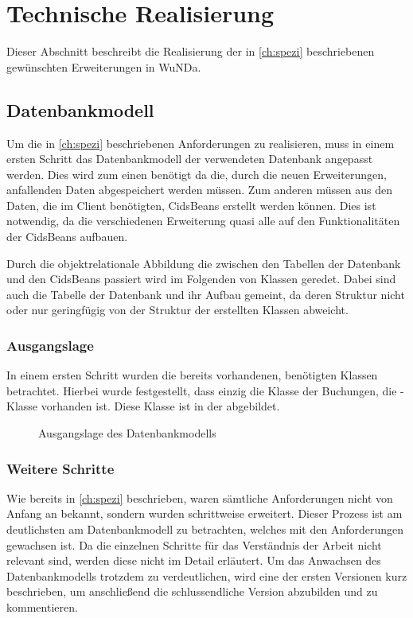 \section{Technische Realisierung}
Dieser Abschnitt beschreibt die Realisierung der in \autoref{ch:spezi} beschriebenen gewünschten Erweiterungen in \ac{WuNDa}.

\subsection{Datenbankmodell}
Um die in \autoref{ch:spezi} beschriebenen Anforderungen zu realisieren, muss in einem ersten Schritt das Datenbankmodell der verwendeten Datenbank angepasst werden.
Dies wird zum einen benötigt da die, durch die neuen Erweiterungen, anfallenden Daten abgespeichert werden müssen. Zum anderen müssen aus den Daten, die im Client benötigten, CidsBeans erstellt werden können. Dies ist notwendig, da die verschiedenen Erweiterung quasi alle auf den Funktionalitäten der CidsBeans aufbauen.

Durch die objektrelationale Abbildung die zwischen den Tabellen der Datenbank und den CidsBeans passiert wird im Folgenden von Klassen geredet.
Dabei sind auch die Tabelle der Datenbank und ihr Aufbau gemeint, da deren Struktur nicht oder nur geringfügig von der Struktur der erstellten Klassen abweicht.

\subsubsection{Ausgangslage}
In einem ersten Schritt wurden die bereits vorhandenen, benötigten Klassen betrachtet. Hierbei wurde festgestellt, dass einzig die Klasse der Buchungen, die -Klasse vorhanden ist. Diese Klasse ist in der  abgebildet.
\begin{figure}[htb]
	\centering
	\caption{Ausgangslage des Datenbankmodells}
	\label{fig:db-billing}
\end{figure}

\subsubsection{Weitere Schritte}
Wie bereits in \autoref{ch:spezi} beschrieben, waren sämtliche Anforderungen nicht von Anfang an bekannt, sondern wurden schrittweise erweitert. Dieser Prozess ist am deutlichsten am Datenbankmodell zu betrachten, welches mit den Anforderungen gewachsen ist.
Da die einzelnen Schritte für das Verständnis der Arbeit nicht relevant sind, werden diese nicht im Detail erläutert.
Um das Anwachsen des Datenbankmodells trotzdem zu verdeutlichen, wird eine der ersten Versionen kurz beschrieben, um anschließend die schlussendliche Version abzubilden und zu kommentieren.

